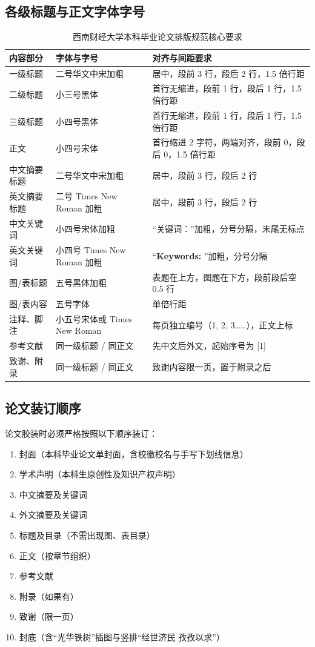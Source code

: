 \subsection{各级标题与正文字体字号}
\begin{table}[htbp]
\centering
\caption{西南财经大学本科毕业论文排版规范核心要求}
\label{tab:swufe-bachelor-rules}
\begin{tabularx}{\textwidth}{p{2.4cm}p{4.2cm}X}
\toprule
\textbf{内容部分} & \textbf{字体与字号} & \textbf{对齐与间距要求} \\
\midrule
一级标题 & 二号华文中宋加粗 & 居中，段前 3 行，段后 2 行，1.5 倍行距 \\
二级标题 & 小三号黑体 & 首行无缩进，段前 1 行，段后 1 行，1.5 倍行距 \\
三级标题 & 小四号黑体 & 首行无缩进，段前 1 行，段后 1 行，1.5 倍行距 \\
正文 & 小四号宋体 & 首行缩进 2 字符，两端对齐，段前 0，段后 0，1.5 倍行距 \\
中文摘要标题 & 二号华文中宋加粗 & 居中，段前 3 行，段后 2 行 \\
英文摘要标题 & 二号 Times New Roman 加粗 & 居中，段前 3 行，段后 2 行 \\
中文关键词 & 小四号宋体加粗 & “关键词：”加粗，分号分隔，末尾无标点 \\
英文关键词 & 小四号 Times New Roman 加粗 & “\textbf{Keywords:} ”加粗，分号分隔 \\
图/表标题 & 五号黑体加粗 & 表题在上方，图题在下方，段前段后空 0.5 行 \\
图/表内容 & 五号字体 & 单倍行距 \\
注释、脚注 & 小五号宋体或 Times New Roman & 每页独立编号（1, 2, 3……），正文上标 \\
参考文献 & 同一级标题 / 同正文 & 先中文后外文，起始序号为 [1] \\
致谢、附录 & 同一级标题 / 同正文 & 致谢内容限一页，置于附录之后 \\
\bottomrule
\end{tabularx}
\end{table}

\subsection{论文装订顺序}
论文胶装时必须严格按照以下顺序装订：
\begin{enumerate}
    \item 封面（本科毕业论文单封面，含校徽校名与手写下划线信息）
    \item 学术声明（本科生原创性及知识产权声明）
    \item 中文摘要及关键词
    \item 外文摘要及关键词
    \item 标题及目录（不需出现图、表目录）
    \item 正文（按章节组织）
    \item 参考文献
    \item 附录（如果有）
    \item 致谢（限一页）
    \item 封底（含“光华铁树”插图与竖排“经世济民 孜孜以求”）
\end{enumerate}

